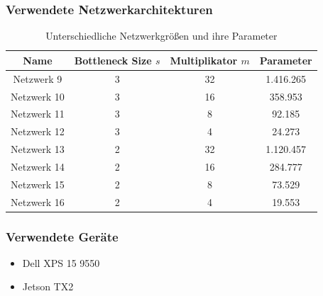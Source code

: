 \begin{frame}
    \frametitle{Verwendete Netzwerkarchitekturen}

    \begin{table}[H]
        \centering
        \begin{tabular}{ |c|c|c|c| }
            \hline
            \textbf{Name} & \textbf{Bottleneck Size $ s $} & \textbf{Multiplikator $ m $} & \textbf{Parameter} \\ \hline
            Netzwerk 9  & 3 & 32 & 1.416.265    \\ \hline
            Netzwerk 10 & 3 & 16 & 358.953      \\ \hline
            Netzwerk 11 & 3 & 8  & 92.185       \\ \hline
            Netzwerk 12 & 3 & 4  & 24.273       \\ \hline
    
            Netzwerk 13 & 2 & 32 & 1.120.457    \\ \hline
            Netzwerk 14 & 2 & 16 & 284.777      \\ \hline
            Netzwerk 15 & 2 & 8  & 73.529       \\ \hline
            Netzwerk 16 & 2 & 4  & 19.553       \\ \hline
        \end{tabular}
        \caption{Unterschiedliche Netzwerkgrößen und ihre Parameter}
        \label{tab:networks}
    \end{table}
\end{frame}


 \begin{frame}
     \frametitle{Verwendete Geräte}
 
     
     \begin{itemize}
         \item Dell XPS 15 9550
         \item Jetson TX2
     \end{itemize}
 \end{frame}


